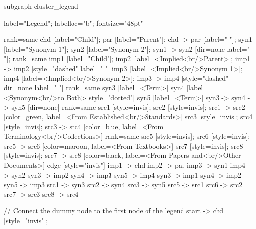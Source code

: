 \documentclass{article}
\begin{document}
{subgraph cluster_legend {

    label="Legend";
    labelloc="b";
    fontsize="48pt"

    {
        rank=same
        chd [label="Child"];
        par [label="Parent"];
        chd -> par [label="                "];
        syn1 [label="Synonym 1"];
        syn2 [label="Synonym 2"];
        syn1 -> syn2 [dir=none label="                "];
    }
    {
        rank=same
        imp1 [label="Child"];
        imp2 [label=<Implied<br/>Parent>];
        imp1 -> imp2 [style="dashed" label="                "]
        imp3 [label=<Implied<br/>Synonym 1>];
        imp4 [label=<Implied<br/>Synonym 2>];
        imp3 -> imp4 [style="dashed" dir=none label="                "]
    }
    {
        rank=same
        syn3 [label=<Term>]
        syn4 [label=<Synonym<br/>to Both> style="dotted"]
        syn5 [label=<Term>]
        syn3 -> syn4 -> syn5 [dir=none]
    }
{
rank=same
src1 [style=invis];
src2 [style=invis];
src1 -> src2 [color=green, label=<From Established<br/>Standards>]
src3 [style=invis];
src4 [style=invis];
src3 -> src4 [color=blue, label=<From Terminology<br/>Collections>]
}
{
rank=same
src5 [style=invis];
src6 [style=invis];
src5 -> src6 [color=maroon, label=<From Textbooks>]
src7 [style=invis];
src8 [style=invis];
src7 -> src8 [color=black, label=<From Papers and<br/>Other Documents>]
}
edge [style="invis"]
imp1 -> chd
imp2 -> par
imp3 -> syn1
imp4 -> syn2
syn3 -> imp2
syn4 -> imp3
syn5 -> imp4
syn3 -> imp1
syn4 -> imp2
syn5 -> imp3
src1 -> syn3
src2 -> syn4
src3 -> syn5
src5 -> src1
src6 -> src2
src7 -> src3
src8 -> src4
}

// Connect the dummy node to the first node of the legend
start -> chd [style="invis"];
}
\end{document}
